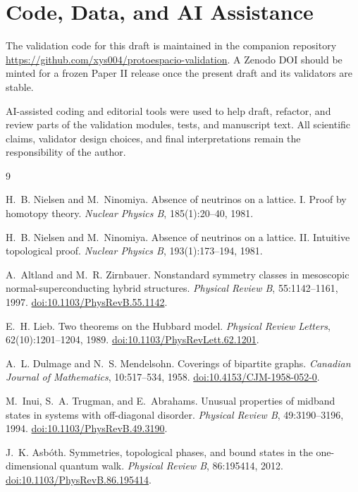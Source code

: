 \documentclass[11pt,a4paper]{article}
\providecommand{\doi}[1]{\href{https://doi.org/#1}{doi:#1}}
\begin{document}
\section*{Code, Data, and AI Assistance}

The validation code for this draft is maintained in the companion repository
\url{https://github.com/xys004/protoespacio-validation}. A Zenodo DOI should be
minted for a frozen Paper II release once the present draft and its validators
are stable.

AI-assisted coding and editorial tools were used to help draft, refactor, and
review parts of the validation modules, tests, and manuscript text. All
scientific claims, validator design choices, and final interpretations remain
the responsibility of the author.

\begin{thebibliography}{9}

H.~B. Nielsen and M.~Ninomiya.
\newblock Absence of neutrinos on a lattice. I. Proof by homotopy theory.
\newblock \emph{Nuclear Physics B}, 185(1):20--40, 1981.

H.~B. Nielsen and M.~Ninomiya.
\newblock Absence of neutrinos on a lattice. II. Intuitive topological proof.
\newblock \emph{Nuclear Physics B}, 193(1):173--194, 1981.

A.~Altland and M.~R. Zirnbauer.
\newblock Nonstandard symmetry classes in mesoscopic normal-superconducting
hybrid structures.
\newblock \emph{Physical Review B}, 55:1142--1161, 1997.
\newblock \doi{10.1103/PhysRevB.55.1142}.

E.~H. Lieb.
\newblock Two theorems on the Hubbard model.
\newblock \emph{Physical Review Letters}, 62(10):1201--1204, 1989.
\newblock \doi{10.1103/PhysRevLett.62.1201}.

A.~L. Dulmage and N.~S. Mendelsohn.
\newblock Coverings of bipartite graphs.
\newblock \emph{Canadian Journal of Mathematics}, 10:517--534, 1958.
\newblock \doi{10.4153/CJM-1958-052-0}.

M.~Inui, S.~A. Trugman, and E.~Abrahams.
\newblock Unusual properties of midband states in systems with off-diagonal
disorder.
\newblock \emph{Physical Review B}, 49:3190--3196, 1994.
\newblock \doi{10.1103/PhysRevB.49.3190}.

J.~K. Asb{\'o}th.
\newblock Symmetries, topological phases, and bound states in the
one-dimensional quantum walk.
\newblock \emph{Physical Review B}, 86:195414, 2012.
\newblock \doi{10.1103/PhysRevB.86.195414}.

\end{thebibliography}
\end{document}
